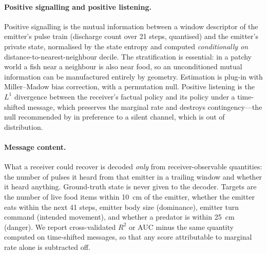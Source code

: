\paragraph{Positive signalling and positive listening.}
Positive signalling \citep{lowe2019pitfalls} is the mutual information between a
window descriptor of the emitter's pulse train (discharge count over 21 steps,
quantised) and the emitter's private state, normalised by the state entropy and
computed \emph{conditionally on} distance-to-nearest-neighbour decile. The
stratification is essential: in a patchy world a fish near a neighbour is also
near food, so an unconditioned mutual information can be manufactured entirely by
geometry. Estimation is plug-in with Miller--Madow bias correction, with a
permutation null. Positive listening is the $L^1$ divergence between the
receiver's factual policy and its policy under a time-shifted message, which
preserves the marginal rate and destroys contingency---the null recommended by
\citet{lowe2019pitfalls} in preference to a silent channel, which is out of
distribution.

\paragraph{Message content.}
What a receiver could recover is decoded \emph{only} from receiver-observable
quantities: the number of pulses it heard from that emitter in a trailing window
and whether it heard anything. Ground-truth state is never given to the decoder.
Targets are the number of live food items within \SI{10}{\centi\metre} of the
emitter, whether the emitter eats within the next 41 steps, emitter body size
(dominance), emitter turn command (intended movement), and whether a predator is
within \SI{25}{\centi\metre} (danger). We report cross-validated $R^2$ or AUC
minus the same quantity computed on time-shifted messages, so that any score
attributable to marginal rate alone is subtracted off.

